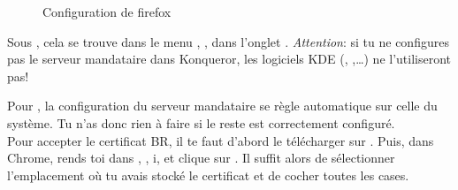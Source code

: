 \noindent
  \begin{figure}[!h]
    \begin{center}  
         	 \caption{Configuration de firefox}
    \end{center}
  \end{figure}


Sous , cela se trouve dans le menu , ,
dans l'onglet . \emph{Attention}: si tu ne configures pas le serveur mandataire dans Konqueror,
les logiciels KDE (, ,\dots) ne l'utiliseront pas!

Pour , la configuration du serveur mandataire se r\`egle automatique sur celle du système. Tu n'as donc rien à faire si le reste est correctement configur\'e.\\
Pour accepter le certificat BR, il te faut d'abord le t\'el\'echarger sur . Puis, dans Chrome, rends toi dans , , i,  et clique sur . Il suffit alors de s\'electionner l'emplacement o\`u tu avais stock\'e le certificat et de cocher toutes les cases.



